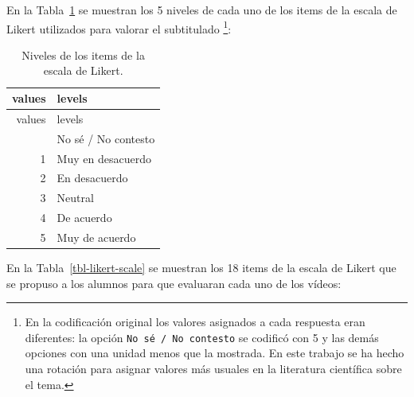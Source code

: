 \documentclass[
  12pt,
  a4paper,
  extrafontsizes,
  onecolumn,
  openright]{memoir}
\begin{document}
En la Tabla~\ref{tbl-likert-levels} se muestran los 5 niveles de cada
uno de los items de la escala de Likert utilizados para valorar el
subtitulado \footnote{En la codificación original los valores asignados
  a cada respuesta eran diferentes: la opción
  \texttt{No\ sé\ /\ No\ contesto} se codificó con 5 y las demás
  opciones con una unidad menos que la mostrada. En este trabajo se ha
  hecho una rotación para asignar valores más usuales en la literatura
  científica sobre el tema.}:

\clearpage

\hypertarget{tbl-likert-levels}{}
\begin{longtable}[]{@{}rl@{}}
\caption{\label{tbl-likert-levels}Niveles de los items de la escala de
Likert.}\tabularnewline
\toprule\noalign{}
values & levels \\
\midrule\noalign{}
\endfirsthead
\toprule\noalign{}
values & levels \\
\midrule\noalign{}
\endhead
\bottomrule\noalign{}
\endlastfoot
0 & No sé / No contesto \\
1 & Muy en desacuerdo \\
2 & En desacuerdo \\
3 & Neutral \\
4 & De acuerdo \\
5 & Muy de acuerdo \\
\end{longtable}

En la Tabla~\ref{tbl-likert-scale} se muestran los 18 items de la escala
de Likert que se propuso a los alumnos para que evaluaran cada uno de
los vídeos:
\end{document}
